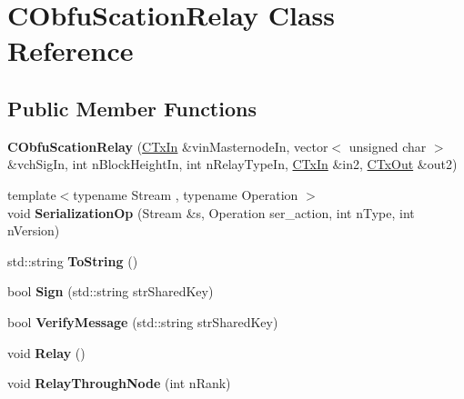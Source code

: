 \hypertarget{class_c_obfu_scation_relay}{}\section{C\+Obfu\+Scation\+Relay Class Reference}
\label{class_c_obfu_scation_relay}
\subsection*{Public Member Functions}
\begin{DoxyCompactItemize}
\item 
\mbox{\label{class_c_obfu_scation_relay_a88c7ba392483fb5cf5a3de649c7e2845}} 
{\bfseries C\+Obfu\+Scation\+Relay} (\mbox{\hyperlink{class_c_tx_in}{C\+Tx\+In}} \&vin\+Masternode\+In, vector$<$ unsigned char $>$ \&vch\+Sig\+In, int n\+Block\+Height\+In, int n\+Relay\+Type\+In, \mbox{\hyperlink{class_c_tx_in}{C\+Tx\+In}} \&in2, \mbox{\hyperlink{class_c_tx_out}{C\+Tx\+Out}} \&out2)
\item 
\mbox{\label{class_c_obfu_scation_relay_ad9a09a7e51b76c6bb0a13d2312dd7ea5}} 
{\footnotesize template$<$typename Stream , typename Operation $>$ }\\void {\bfseries Serialization\+Op} (Stream \&s, Operation ser\+\_\+action, int n\+Type, int n\+Version)
\item 
\mbox{\label{class_c_obfu_scation_relay_a193896557689f778a5381ea8dc7e66b8}} 
std\+::string {\bfseries To\+String} ()
\item 
\mbox{\label{class_c_obfu_scation_relay_a6a0c143f5d9536a64bcb1745d2011761}} 
bool {\bfseries Sign} (std\+::string str\+Shared\+Key)
\item 
\mbox{\label{class_c_obfu_scation_relay_aa76fd65563c22d322350e09b2b876e9d}} 
bool {\bfseries Verify\+Message} (std\+::string str\+Shared\+Key)
\item 
\mbox{\label{class_c_obfu_scation_relay_ae3bb081dc03a7c07be2a85ca2512f581}} 
void {\bfseries Relay} ()
\item 
\mbox{\label{class_c_obfu_scation_relay_a68272322a5123591a9f57a8ff07943f6}} 
void {\bfseries Relay\+Through\+Node} (int n\+Rank)
\end{DoxyCompactItemize}
